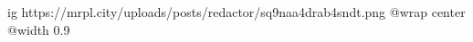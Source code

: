  
 
 
 
 

\ifcmt
  ig https://mrpl.city/uploads/posts/redactor/sq9naa4drab4sndt.png
  @wrap center
  @width 0.9
\fi

